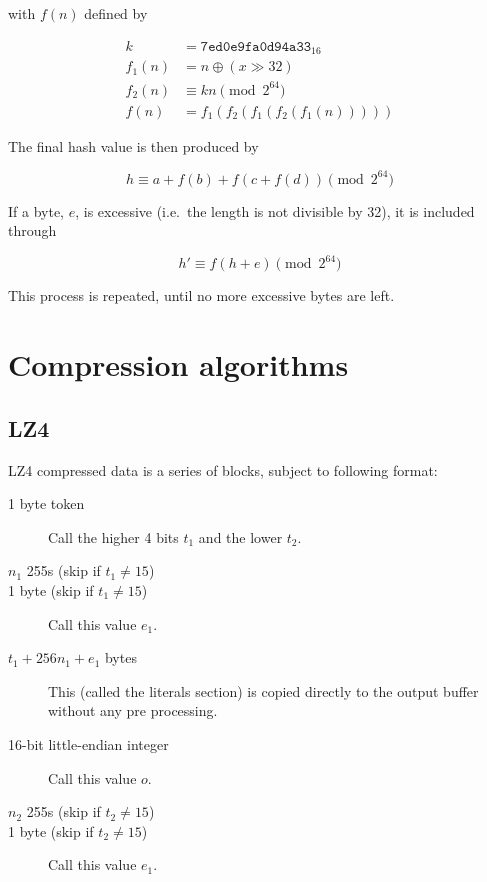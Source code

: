 \documentclass[11pt,a4paper]{report}
\begin{document}
        with $f(n)$ defined by

        \begin{align*}
            k      &=      \texttt{7ed0e9fa0d94a33}_{16} \\
            f_1(n) &=      n \oplus (x \gg 32) \\
            f_2(n) &\equiv kn \pmod{2^{64}} \\
            f(n)   &=      f_1(f_2(f_1(f_2(f_1(n)))))
        \end{align*}

        The final hash value is then produced by

        $$h \equiv a + f(b) + f(c + f(d)) \pmod{2^{64}}$$

        If a byte, $e$, is excessive (i.e.\ the length is not divisible by 32), it is included through

        $$h' \equiv f(h + e) \pmod{2^{64}}$$

        This process is repeated, until no more excessive bytes are left.

    \section{Compression algorithms}
        \subsection{LZ4}
        \label{compression:lz4}
        LZ4 compressed data is a series of blocks, subject to following format:

        \begin{description}
            \item [1 byte token] Call the higher 4 bits $t_1$ and the lower $t_2$.
            \item [$n_1$ 255s (skip if $t_1 \neq 15$)]
            \item [1 byte (skip if $t_1 \neq 15$)] Call this value $e_1$.
            \item [$t_1 + 256n_1 + e_1$ bytes] This (called the literals
                section) is copied directly to the output buffer without any
                pre processing.
            \item [16-bit little-endian integer] Call this value $o$.
            \item [$n_2$ 255s (skip if $t_2 \neq 15$)]
            \item [1 byte (skip if $t_2 \neq 15$)] Call this value $e_1$.
        \end{description}
\end{document}

